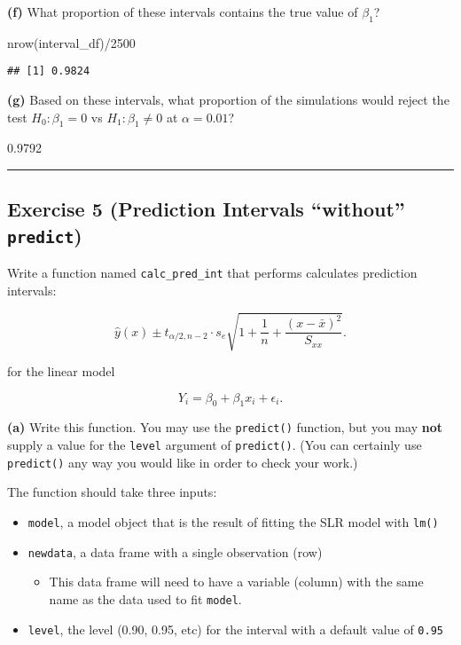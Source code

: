 \documentclass[
]{article}
\newenvironment{Shaded}{\begin{snugshade}}{\end{snugshade}}
\newcommand{\DecValTok}[1]{\textcolor[rgb]{0.00,0.00,0.81}{#1}}
\newcommand{\FunctionTok}[1]{\textcolor[rgb]{0.00,0.00,0.00}{#1}}
\newcommand{\NormalTok}[1]{#1}
\newcommand{\SpecialCharTok}[1]{\textcolor[rgb]{0.00,0.00,0.00}{#1}}
\providecommand{\tightlist}{%
  \setlength{\itemsep}{0pt}\setlength{\parskip}{0pt}}
\begin{document}
\textbf{(f)} What proportion of these intervals contains the true value
of \(\beta_1\)?

\begin{Shaded}
\begin{Highlighting}[]
\FunctionTok{nrow}\NormalTok{(interval\_df)}\SpecialCharTok{/}\DecValTok{2500}
\end{Highlighting}
\end{Shaded}

\begin{verbatim}
## [1] 0.9824
\end{verbatim}

\textbf{(g)} Based on these intervals, what proportion of the
simulations would reject the test \(H_0: \beta_1 = 0\) vs
\(H_1: \beta_1 \neq 0\) at \(\alpha = 0.01\)?

0.9792

\begin{center}\rule{0.5\linewidth}{0.5pt}\end{center}

\hypertarget{exercise-5-prediction-intervals-without-predict}{%
\subsection{\texorpdfstring{Exercise 5 (Prediction Intervals ``without''
\texttt{predict})}{Exercise 5 (Prediction Intervals ``without'' predict)}}\label{exercise-5-prediction-intervals-without-predict}}

Write a function named \texttt{calc\_pred\_int} that performs calculates
prediction intervals:

\[
\hat{y}(x) \pm t_{\alpha/2, n - 2} \cdot s_e\sqrt{1 + \frac{1}{n}+\frac{(x-\bar{x})^2}{S_{xx}}}.
\]

for the linear model

\[
Y_i = \beta_0 + \beta_1 x_i + \epsilon_i.
\]

\textbf{(a)} Write this function. You may use the \texttt{predict()}
function, but you may \textbf{not} supply a value for the \texttt{level}
argument of \texttt{predict()}. (You can certainly use
\texttt{predict()} any way you would like in order to check your work.)

The function should take three inputs:

\begin{itemize}
\tightlist
\item
  \texttt{model}, a model object that is the result of fitting the SLR
  model with \texttt{lm()}
\item
  \texttt{newdata}, a data frame with a single observation (row)

  \begin{itemize}
  \tightlist
  \item
    This data frame will need to have a variable (column) with the same
    name as the data used to fit \texttt{model}.
  \end{itemize}
\item
  \texttt{level}, the level (0.90, 0.95, etc) for the interval with a
  default value of \texttt{0.95}
\end{itemize}
\end{document}

